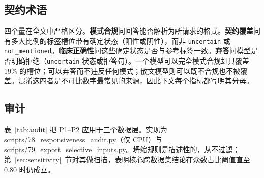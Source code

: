 \subsection{契约术语}

四个量在全文中严格区分。\textbf{模式合规}问回答能否解析为所请求的格式。\textbf{契约覆盖}问有多大比例的标签槽位带有确定状态（阳性或阴性），而非 \texttt{uncertain} 或 \texttt{not\_mentioned}。\textbf{临床正确性}问这些确定状态是否与参考标签一致。\textbf{弃答}问模型是否明确拒绝（\texttt{uncertain} 状态或拒答句）。一个模型可以完全模式合规却只覆盖 19\% 的槽位；可以弃答而不违反任何模式；散文模型则可以既不合规也不被覆盖。混淆这四者是不可比数字最常见的来源，因此下文每个指标都写明其分母。

\subsection{审计}

表~\ref{tab:audit} 把 P1--P2 应用于三个数据层。实现为 \url{scripts/78_responsiveness_audit.py}（仅 CPU）与 \url{scripts/79_export_selective_inputs.py}。坍缩规则是描述性的，从不过滤；第~\ref{sec:sensitivity}~节对其做扫描，表明核心跨数据集结论在众数占比阈值直至 0.80 时仍成立。

